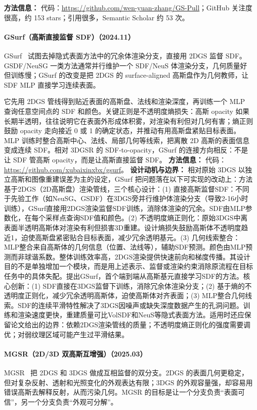 \textbf{方法信息：} 代码：\url{https://github.com/wen-yuan-zhang/GS-Pull}；GitHub 关注度很高，约 153 stars；引用很多，Semantic Scholar 约 53 次。



\paragraph{GSurf（高斯直接监督 SDF）（2024.11）}
GSurf~\cite{2411_15723} 试图去掉隐式表面方法中的冗余体渲染分支，直接用 2DGS 监督 SDF。GSDF/NeuSG 一类方法通常并行维护一个 SDF/NeuS 体渲染分支，几何质量好但训练慢；GSurf 的改变是把 2DGS 的 surface-aligned 高斯盘作为几何教师，让 SDF MLP 直接学习连续表面。

它先用 2DGS 管线得到贴近表面的高斯盘、法线和渲染深度，再训练一个 MLP 查询任意空间点的 SDF 和颜色。关键正则是不透明度熵损失：高斯 opacity 如果长期半透明，往往说明它在表面外形成体积雾，对渲染有利但对几何有害；熵正则鼓励 opacity 走向接近 0 或 1 的确定状态，并推动有用高斯盘紧贴目标表面。MLP 训练时整合高斯中心、法线、局部几何等线索，把离散 2D 高斯的表面信息变成连续 SDF。相对 3DGSR 的 SDF-to-opacity，GSurf 的连接方向相反：不是让 SDF 管高斯 opacity，而是让高斯直接监督 SDF。
\textbf{方法信息：} 代码：\url{https://github.com/xubaixinxbx/gsurf}。
\textbf{设计动机与边界：} 相对原始 3DGS 以独立高斯和图像重建误差为主的设定，GSurf 把问题落在以下可实现的改动上：方法基于2DGS（2D高斯盘）渲染管线，三个核心设计：(1) 直接高斯监督SDF：不同于先验工作（如NeuSG、GSDF）在3DGS旁并行维护体渲染分支（导致2-16小时训练），GSurf直接用2DGS渲染监督SDF训练，消除体渲染的冗余。SDF由MLP参数化，在每个采样点查询SDF值和颜色。(2) 不透明度熵正则化：原始3DGS中离表面半透明高斯体对渲染有利但损害3D重建。设计熵损失鼓励高斯体不透明度趋近1，迫使高斯盘紧密贴合目标表面，减少冗余透明基元。(3) 几何线索整合：MLP整合来自高斯体的几何信息（位置、法线等），辅助SDF预测。颜色由MLP预测而非球谐系数。整体训练效率高，2DGS渲染提供快速前向和梯度传播。其设计目的不是单独增加一个模块，而是用上述表示、监督或渲染约束消除原流程在目标任务中的具体失配。提出GSurf，首个端到端从高斯基元直接学习SDF的方法。核心创新：(1) SDF直接在3DGS监督下训练，消除冗余体渲染分支；(2) 基于熵的不透明度正则化，减少冗余透明高斯体，迫使高斯体对齐表面；(3) MLP整合几何线索。SDF的连续平滑特性解决了3DGS因噪声或缺失深度数据产生的孔洞问题。训练和渲染速度更快，重建质量可比VolSDF和NeuS等隐式表面方法。适用时还应保留论文给出的边界：依赖2DGS渲染管线的质量；不透明度熵正则化的强度需要调优；对弱纹理区域可能产生过平滑结果。
\paragraph{MGSR（2D/3D 双高斯互增强）（2025.03）}
MGSR~\cite{2503_05182} 把 2DGS 和 3DGS 做成互相监督的双分支。2DGS 的表面几何更稳定，但对复杂反射、透射和光照变化的外观表达有限；3DGS 的外观容量强，却容易用错误高斯去解释反射，从而污染几何。MGSR 的目标是让一个分支负责“表面可信”，另一个分支负责“外观可分解”。

